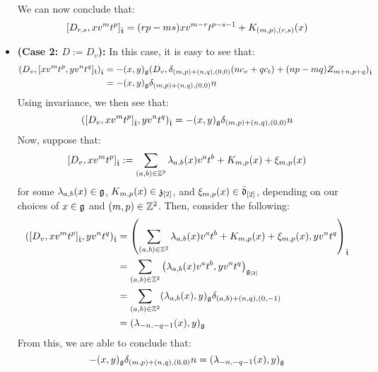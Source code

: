\begin{remark}
\begin{itemize}
                    We can now conclude that:
                        $$[D_{r, s}, x v^m t^p]_{\hat{\mathfrak{t}}} = ( rp - ms ) x v^{m - r} t^{p - s - 1} + K_{(m, p), (r, s)}(x)$$
                    \item \textbf{(Case 2: $D := D_v$):} In this case, it is easy to see that:
                        $$
                            \begin{aligned}
                                ( D_v, [x v^m t^p, y v^n t^q]_{\mathfrak{t}} )_{\hat{\mathfrak{t}}} & = -(x, y)_{\mathfrak{g}} ( D_v, \delta_{(m, p) + (n, q), (0, 0)} ( n c_v + q c_t ) + (np - mq) Z_{m + n, p + q} )_{\hat{\mathfrak{t}}}
                                \\
                                & = -(x, y)_{\mathfrak{g}} \delta_{(m, p) + (n, q), (0, 0)} n
                            \end{aligned}
                        $$
                    Using invariance, we then see that:
                        $$( [D_v, x v^m t^p]_{\hat{\mathfrak{t}}}, y v^n t^q )_{\hat{\mathfrak{t}}} = -(x, y)_{\mathfrak{g}} \delta_{(m, p) + (n, q), (0, 0)} n$$
                    Now, suppose that:
                        $$[D_v, x v^m t^p]_{\hat{\mathfrak{t}}} := \sum_{(a, b) \in \mathbb{Z}^2} \lambda_{a, b}(x) v^a t^b + K_{m, p}(x) + \xi_{m, p}(x)$$
                    for some $\lambda_{a, b}(x) \in \mathfrak{g}$, $K_{m, p}(x) \in \mathfrak{z}_{[2]}$, and $\xi_{m, p}(x) \in \bar{\mathfrak{d}}_{[2]}$, depending on our choices of $x \in \mathfrak{g}$ and $(m, p) \in \mathbb{Z}^2$. Then, consider the following:
                        $$
                            \begin{aligned}
                                ( [D_v, x v^m t^p]_{\hat{\mathfrak{t}}}, y v^n t^q )_{\hat{\mathfrak{t}}} & = \left( \sum_{(a, b) \in \mathbb{Z}^2} \lambda_{a, b}(x) v^a t^b + K_{m, p}(x) + \xi_{m, p}(x), y v^n t^q \right)_{\hat{\mathfrak{t}}}
                                \\
                                & = \sum_{(a, b) \in \mathbb{Z}^2} \left( \lambda_{a, b}(x) v^a t^b, y v^n t^q \right)_{\mathfrak{g}_{[2]}}
                                \\
                                & = \sum_{(a, b) \in \mathbb{Z}^2} (\lambda_{a, b}(x), y)_{\mathfrak{g}} \delta_{ (a, b) + (n, q), (0, -1) }
                                \\
                                & = (\lambda_{-n, -q - 1}(x), y)_{\mathfrak{g}}
                            \end{aligned}
                        $$
                    From this, we are able to conclude that:
                        $$-(x, y)_{\mathfrak{g}} \delta_{(m, p) + (n, q), (0, 0)} n = (\lambda_{-n, -q - 1}(x), y)_{\mathfrak{g}}$$

\end{itemize}
\end{remark}
